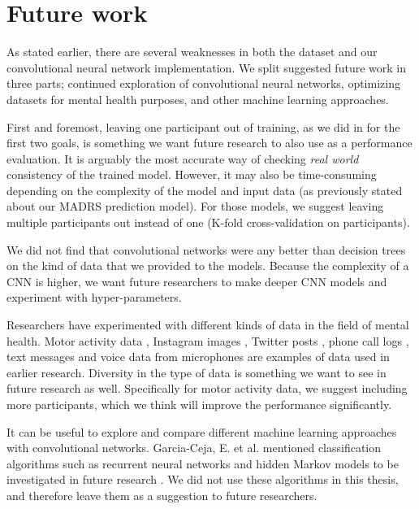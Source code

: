 \section{Future work}
As stated earlier, there are several weaknesses in both the dataset and our convolutional neural network implementation. We split suggested future work in three parts; continued exploration of convolutional neural networks, optimizing datasets for mental health purposes, and other machine learning approaches. 

First and foremost, leaving one participant out of training, as we did in for the first two goals, is something we want future research to also use as a performance evaluation. It is arguably the most accurate way of checking \textit{real world} consistency of the trained model. However, it may also be time-consuming depending on the complexity of the model and input data (as previously stated about our MADRS prediction model). For those models, we suggest leaving multiple participants out instead of one (K-fold cross-validation on participants).

We did not find that convolutional networks were any better than decision trees on the kind of data that we provided to the models. Because the complexity of a CNN is higher, we want future researchers to make deeper CNN models and experiment with hyper-parameters. 

Researchers have experimented with different kinds of data in the field of mental health. Motor activity data \cite{obrien_depression, GarciaCeja2018_classification_bipolar}, Instagram images \cite{instagram_depression}, Twitter posts \cite{twitter_depression}, phone call logs \cite{faurholt_smartphone_bipolar, grunerbl_smartphone_bipolar}, text messages and voice data from microphones \cite{grunerbl_smartphone_bipolar} are examples of data used in earlier research. Diversity in the type of data is something we want to see in future research as well. Specifically for motor activity data, we suggest including more participants, which we think will improve the performance significantly.

It can be useful to explore and compare different machine learning approaches with convolutional networks. Garcia-Ceja, E. et al. mentioned classification algorithms such as recurrent neural networks and hidden Markov models to be investigated in future research \cite{GarciaCeja2018_classification_bipolar}. We did not use these algorithms in this thesis, and therefore leave them as a suggestion to future researchers. 